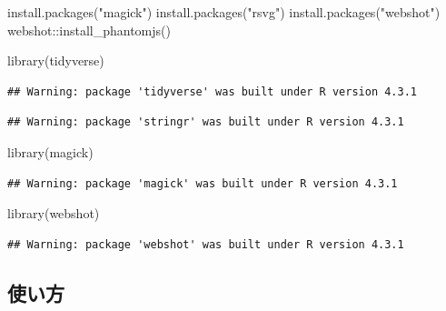 \documentclass[
]{article}
\newenvironment{Shaded}{\begin{snugshade}}{\end{snugshade}}
\newcommand{\FunctionTok}[1]{\textcolor[rgb]{0.00,0.00,0.00}{#1}}
\newcommand{\NormalTok}[1]{#1}
\newcommand{\SpecialCharTok}[1]{\textcolor[rgb]{0.00,0.00,0.00}{#1}}
\newcommand{\StringTok}[1]{\textcolor[rgb]{0.31,0.60,0.02}{#1}}
\begin{document}
\begin{Shaded}
\begin{Highlighting}[]
\FunctionTok{install.packages}\NormalTok{(}\StringTok{"magick"}\NormalTok{)}
\FunctionTok{install.packages}\NormalTok{(}\StringTok{"rsvg"}\NormalTok{)}
\FunctionTok{install.packages}\NormalTok{(}\StringTok{"webshot"}\NormalTok{)}
\NormalTok{webshot}\SpecialCharTok{::}\FunctionTok{install\_phantomjs}\NormalTok{()}
\end{Highlighting}
\end{Shaded}

\begin{Shaded}
\begin{Highlighting}[]
\FunctionTok{library}\NormalTok{(tidyverse)}
\end{Highlighting}
\end{Shaded}

\begin{verbatim}
## Warning: package 'tidyverse' was built under R version 4.3.1
\end{verbatim}

\begin{verbatim}
## Warning: package 'stringr' was built under R version 4.3.1
\end{verbatim}

\begin{Shaded}
\begin{Highlighting}[]
\FunctionTok{library}\NormalTok{(magick)}
\end{Highlighting}
\end{Shaded}

\begin{verbatim}
## Warning: package 'magick' was built under R version 4.3.1
\end{verbatim}

\begin{Shaded}
\begin{Highlighting}[]
\FunctionTok{library}\NormalTok{(webshot)}
\end{Highlighting}
\end{Shaded}

\begin{verbatim}
## Warning: package 'webshot' was built under R version 4.3.1
\end{verbatim}

\hypertarget{ux4f7fux3044ux65b9-1}{%
\subsection{使い方}\label{ux4f7fux3044ux65b9-1}}
\end{document}
